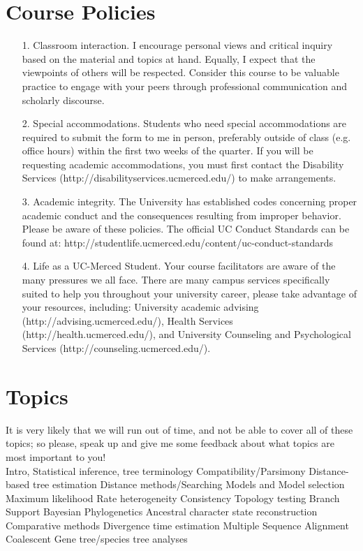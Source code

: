 \documentclass{article}
\begin{document}
\section*{Course Policies}
\begin{itemize}
 \item[1.] Classroom interaction. I encourage personal views and critical inquiry based on the material and topics at hand. Equally, I expect that the viewpoints of others will be respected. Consider this course to be valuable practice to engage with your peers through professional communication and scholarly discourse. 
 \item[2.] Special accommodations. Students who need special accommodations are required to submit the form to me in person, preferably outside of class (e.g. office hours) within the first two weeks of the quarter. If you will be requesting academic accommodations, you must first contact the Disability Services (http://disabilityservices.ucmerced.edu/) to make arrangements.
\item[3.] Academic integrity. The University has established codes concerning proper academic conduct and the consequences resulting from improper behavior. 
Please be aware of these policies. The official UC Conduct Standards can be found at: http://studentlife.ucmerced.edu/content/uc-conduct-standards
\item[4.] Life as a UC-Merced Student. Your course facilitators are aware of the many pressures we all face. There are many campus services specifically suited to help you throughout your university career, please take advantage of your resources, including: University academic advising (http://advising.ucmerced.edu/), Health Services (http://health.ucmerced.edu/), and University Counseling and Psychological Services (http://counseling.ucmerced.edu/).
\end{itemize}

\section*{Topics}
It is very likely that we will run out of time, and not be able to cover all of these topics; so
please, speak up and give me some feedback about what topics are most important to you!\\

Intro, Statistical inference, tree terminology
Compatibility/Parsimony
Distance-based tree estimation
Distance methods/Searching
Models and Model selection
Maximum likelihood
Rate heterogeneity
Consistency
Topology testing
Branch Support
Bayesian Phylogenetics
Ancestral character state reconstruction
Comparative methods
Divergence time estimation
Multiple Sequence Alignment
Coalescent
Gene tree/species tree analyses
\end{document}
